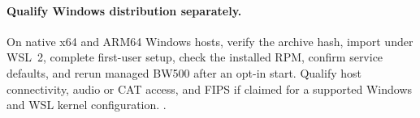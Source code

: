 \paragraph{Qualify Windows distribution separately.}
On native x64 and ARM64 Windows hosts, verify the archive hash, import
under WSL~2, complete first-user setup, check the installed RPM, confirm
service defaults, and rerun managed BW500 after an opt-in start.
Qualify host connectivity, audio or CAT access, and FIPS if claimed
for a supported Windows and WSL kernel configuration.
.
